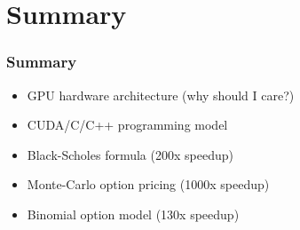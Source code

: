 \documentclass[xcolor={x11names,svgnames,dvipsnames}]{beamer}
\begin{document}
\section{Summary}
\begin{frame}
\frametitle{Summary}
\begin{itemize}
\item GPU hardware architecture (why should I care?)
\item CUDA/C/C++ programming model
\item Black-Scholes formula (200x speedup)
\item Monte-Carlo option pricing (1000x speedup)
\item Binomial option model (130x speedup)
\end{itemize}
\end{frame}
\end{document}

